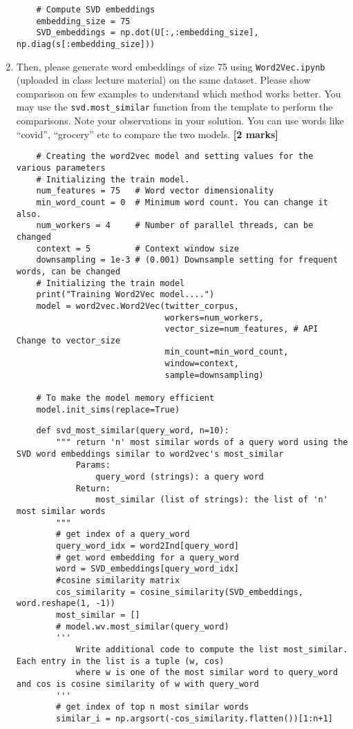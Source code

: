 \begin{enumerate}
\begin{lstlisting}
    # Compute SVD embeddings
    embedding_size = 75
    SVD_embeddings = np.dot(U[:,:embedding_size], np.diag(s[:embedding_size]))
  \end{lstlisting}
  \item Then, please generate word embeddings of size 75 using \lstinline{Word2Vec.ipynb} (uploaded in class lecture material) on the same dataset. Please show comparison on few examples to understand which method works better. You may use the \lstinline{svd.most_similar} function from the template to perform the comparisons. Note your observations in your solution. You can use words like “covid”, “grocery” etc to compare the two models. {\bf [2 marks]}
        \begin{lstlisting}
    # Creating the word2vec model and setting values for the various parameters
    # Initializing the train model. 
    num_features = 75   # Word vector dimensionality
    min_word_count = 0  # Minimum word count. You can change it also.
    num_workers = 4     # Number of parallel threads, can be changed
    context = 5         # Context window size
    downsampling = 1e-3 # (0.001) Downsample setting for frequent words, can be changed
    # Initializing the train model
    print("Training Word2Vec model....")
    model = word2vec.Word2Vec(twitter_corpus,
                              workers=num_workers,
                              vector_size=num_features, # API Change to vector_size
                              min_count=min_word_count,
                              window=context,
                              sample=downsampling)

    # To make the model memory efficient
    model.init_sims(replace=True)
  \end{lstlisting}
        \begin{lstlisting}
    def svd_most_similar(query_word, n=10):
        """ return 'n' most similar words of a query word using the SVD word embeddings similar to word2vec's most_similar    
            Params:
                query_word (strings): a query word
            Return:
                most_similar (list of strings): the list of 'n' most similar words
        """
        # get index of a query_word
        query_word_idx = word2Ind[query_word]
        # get word embedding for a query_word
        word = SVD_embeddings[query_word_idx]
        #cosine similarity matrix
        cos_similarity = cosine_similarity(SVD_embeddings, word.reshape(1, -1))
        most_similar = []
        # model.wv.most_similar(query_word)
        '''
            Write additional code to compute the list most_similar. Each entry in the list is a tuple (w, cos)
            where w is one of the most similar word to query_word and cos is cosine similarity of w with query_word
        '''
        # get index of top n most similar words
        similar_i = np.argsort(-cos_similarity.flatten())[1:n+1]
        

\end{lstlisting}
\end{enumerate}
